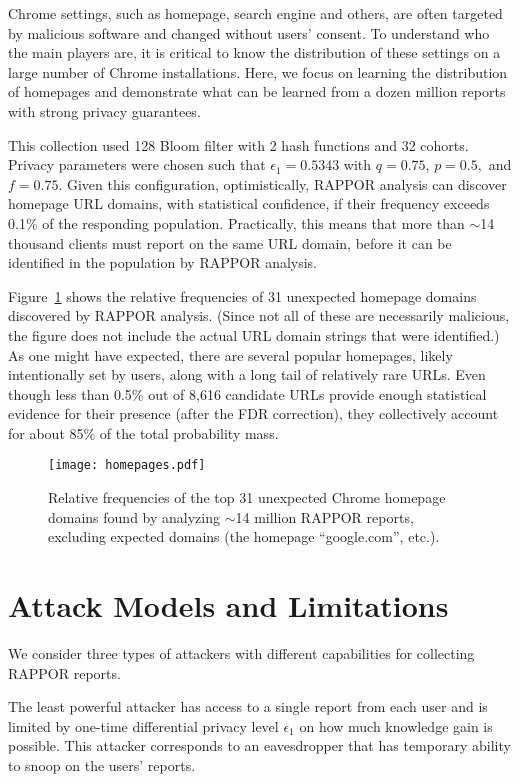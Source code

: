 \documentclass{sig-alternate-2013}
\newcommand\RAPPOR{{RAPPOR}}
\begin{document}
Chrome settings, such as homepage, search engine and others, are often targeted by malicious software and changed without users' consent. To understand who the main players are, it is critical to know the distribution of these settings on a large number of Chrome installations. Here, we focus on learning the distribution of homepages and demonstrate what can be learned from a dozen million reports with strong privacy guarantees.

This collection used 128 Bloom filter with 2 hash functions and 32 cohorts. Privacy parameters were chosen such that $\epsilon_1 = 0.5343$ with $q = 0.75$, $p = 0.5,$ and $f = 0.75$. 
Given this configuration, optimistically, \RAPPOR{} analysis can discover homepage URL domains, with statistical confidence, if their frequency exceeds 0.1\% of the responding population.
Practically, this means that more than $\sim$14 thousand clients must report on the same URL domain, before it can be identified in the population by \RAPPOR{} analysis.

Figure~\ref{fig:detectedtwo} shows the relative frequencies of 31 unexpected homepage domains discovered by \RAPPOR{} analysis.
(Since not all of these are necessarily malicious, the figure does not include the actual URL domain strings that were identified.)
As one might have expected, there are several popular homepages, likely intentionally set by users, along with a long tail of relatively rare URLs. Even though less than 0.5\% out of 8,616 candidate URLs provide enough statistical evidence for their presence (after the FDR correction), they collectively account for about 85\% of the total probability mass. 

\begin{figure}[!t]
\centering
\texttt{[image: homepages.pdf]}
\caption{Relative frequencies of the top 31 unexpected Chrome homepage domains found by analyzing $\sim$14 million \RAPPOR{} reports, excluding expected domains
(the homepage ``google.com'', etc.).}
\label{fig:detectedtwo}
\end{figure}


\section{Attack Models and Limitations}\label{sec:attacks}
We consider three types of attackers with different capabilities for collecting \RAPPOR{} reports. 

The least powerful attacker has access to a single report from each user and is limited by one-time differential privacy level $\epsilon_1$ on how much knowledge gain is possible. 
This attacker corresponds to an eavesdropper that has temporary ability to snoop on the users' reports.
\end{document}
